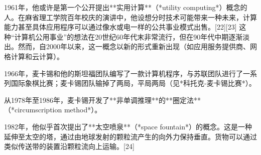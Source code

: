 1961年，他或许是第一个公开提出**实用计算**（*utility computing*）概念的人。在麻省理工学院百年校庆的演讲中，他设想分时技术可能带来一种未来，计算能力甚至具体应用程序可以通过像水或电一样的公共事业模式出售。[22][23] 这种“计算机公用事业”的想法在20世纪60年代末非常流行，但在90年代中期逐渐淡出。然而，自2000年以来，这一概念以新的形式重新出现（如应用服务提供商、网格计算和云计算）。

1966年，麦卡锡和他的斯坦福团队编写了一款计算机程序，与苏联团队进行了一系列国际象棋比赛；麦卡锡团队输掉了两局，平局两局（见*科托克-麦卡锡比赛*）。

从1978年至1986年，麦卡锡开发了**非单调推理**的**圈定法**（*circumscription method*）。

1982年，他似乎首次提出了**太空喷泉**（*space fountain*）的概念。这是一种延伸至太空的塔，通过由地球发射的颗粒流产生的向外力保持垂直。货物可以通过类似传送带的装置沿颗粒流向上运输。[24]